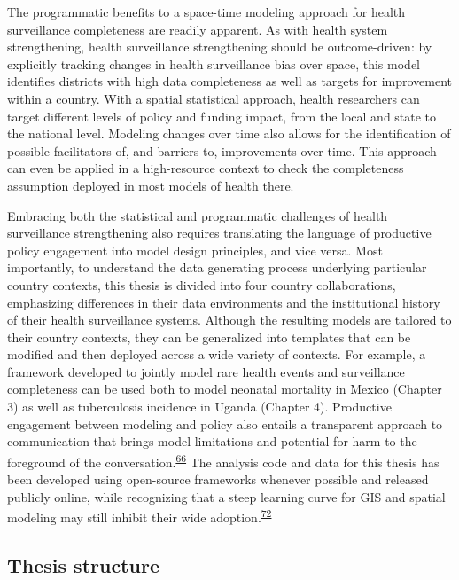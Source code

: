 \documentclass[
]{article}
\begin{document}
The programmatic benefits to a space-time modeling approach for health surveillance completeness are readily apparent. As with health system strengthening, health surveillance strengthening should be outcome-driven: by explicitly tracking changes in health surveillance bias over space, this model identifies districts with high data completeness as well as targets for improvement within a country. With a spatial statistical approach, health researchers can target different levels of policy and funding impact, from the local and state to the national level. Modeling changes over time also allows for the identification of possible facilitators of, and barriers to, improvements over time. This approach can even be applied in a high-resource context to check the completeness assumption deployed in most models of health there.

Embracing both the statistical and programmatic challenges of health surveillance strengthening also requires translating the language of productive policy engagement into model design principles, and vice versa. Most importantly, to understand the data generating process underlying particular country contexts, this thesis is divided into four country collaborations, emphasizing differences in their data environments and the institutional history of their health surveillance systems. Although the resulting models are tailored to their country contexts, they can be generalized into templates that can be modified and then deployed across a wide variety of contexts. For example, a framework developed to jointly model rare health events and surveillance completeness can be used both to model neonatal mortality in Mexico (Chapter 3) as well as tuberculosis incidence in Uganda (Chapter 4). Productive engagement between modeling and policy also entails a transparent approach to communication that brings model limitations and potential for harm to the foreground of the conversation.\textsuperscript{\protect\hyperlink{ref-Cinnamon2020a}{66}} The analysis code and data for this thesis has been developed using open-source frameworks whenever possible and released publicly online, while recognizing that a steep learning curve for GIS and spatial modeling may still inhibit their wide adoption.\textsuperscript{\protect\hyperlink{ref-Shannon2018}{72}}

\hypertarget{thesis-structure}{%
\subsection{Thesis structure}\label{thesis-structure}}
\end{document}
